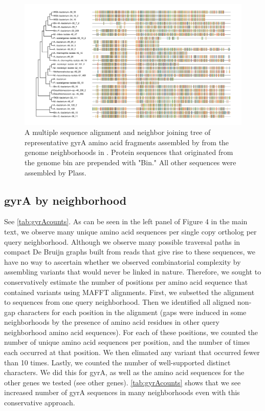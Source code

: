 \begin{figure}
 \centering
 \includegraphics[width=\linewidth]{gyrA-cdhit95-msa}
	\caption{A multiple sequence alignment and neighbor joining tree of representative gyrA amino acid fragments assembled by \plass from the genome neighborhoods in \hu. Protein sequences that originated from the genome bin are prepended with "Bin." All other sequences were assembled by Plass.
 }
 \label{fig:gyrAalign}
\end{figure}

\subsection{gyrA by neighborhood}
\label{subsec:gyrAnbhd}

See \autoref{tab:gyrAcounts}. As can be seen in the left panel of Figure 4 in the
main text, we observe many unique amino acid sequences per single copy ortholog
per query neighborhood.
Although we observe many possible traversal paths in compact De Bruijn graphs built
from reads that give rise to these sequences, we have no way to ascertain whether we
observed combinatorial complexity by assembling variants that would never be linked
in nature. Therefore, we sought to conservatively estimate the number of positions
per amino acid sequence that contained variants using MAFFT alignments. First, we
subsetted the alignment to sequences from one query neighborhood. Then we identified
all aligned non-gap characters for each position in the alignment (gaps were induced
in some neighborhoods by the presence of amino acid residues in other query neighborhood
amino acid sequences). For each of these positions, we counted the number of unique
amino acid sequences per position, and the number of times each occurred at that position.
We then elimated any variant that occurred fewer than 10 times. Lastly, we counted the
number of well-supported distinct characters. We did this for gyrA, as well as the
amino acid sequences for the other genes we tested (see other genes). \autoref{tab:gyrAcounts}
shows that we see increased number of gyrA sequences in many neighborhoods even with
this conservative approach.


